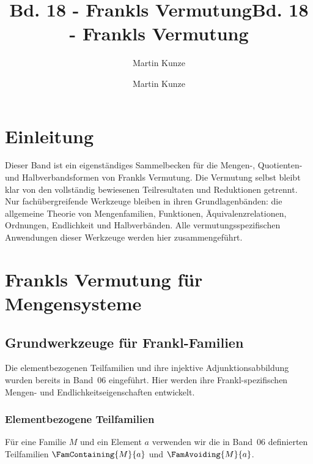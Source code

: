 \documentclass[main.tex]{subfiles}
\title{Bd. 18 - Frankls Vermutung}
\author{Martin Kunze}
\date{}
\begin{document}
\title{Bd. 18 - Frankls Vermutung}
\author{Martin Kunze}
\date{}
\hypersetup{pageanchor=false}
\maketitle
\hypersetup{pageanchor=true}
\setcounter{tocdepth}{3}
\tableofcontents
\setcounter{file}{18}
\renewcommand{\FormulaBandID}{18}
\newcommand{\ProofRefStack}[1]{%
  \ensuremath{\begin{gathered}#1\end{gathered}}}

\chapter{Einleitung}

Dieser Band ist ein eigenständiges Sammelbecken für die Mengen-, Quotienten-
und Halbverbandsformen von Frankls Vermutung. Die Vermutung selbst bleibt
klar von den vollständig bewiesenen Teilresultaten und Reduktionen getrennt.
Nur fachübergreifende Werkzeuge bleiben in ihren Grundlagenbänden: die
allgemeine Theorie von Mengenfamilien, Funktionen, Äquivalenzrelationen,
Ordnungen, Endlichkeit und Halbverbänden. Alle vermutungsspezifischen
Anwendungen dieser Werkzeuge werden hier zusammengeführt.

\chapter{Frankls Vermutung für Mengensysteme}

\section{Grundwerkzeuge für Frankl-Familien}

Die elementbezogenen Teilfamilien und ihre injektive Adjunktionsabbildung
wurden bereits in Band~06 eingeführt. Hier werden ihre
Frankl-spezifischen Mengen- und Endlichkeitseigenschaften entwickelt.

\subsection{Elementbezogene Teilfamilien}

Für eine Familie \(M\) und ein Element \(a\) verwenden wir die in Band~06
definierten Teilfamilien \(\FamContaining{M}{a}\) und
\(\FamAvoiding{M}{a}\).

\begin{tabproof}
\end{tabproof}
\end{document}
